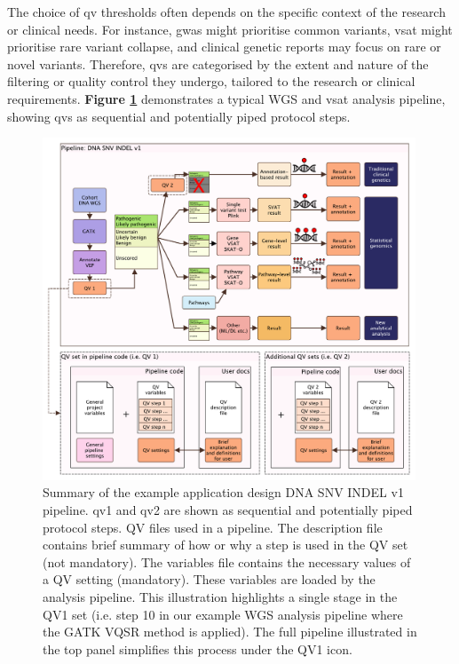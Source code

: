 The choice of \ac{qv} thresholds often depends on the specific context of the research or clinical needs. 
For instance, \ac{gwas} might prioritise common variants, 
\ac{vsat} might prioritise rare variant collapse, 
and clinical genetic reports may focus on rare or novel variants. 
Therefore, \ac{qv}s are categorised by the extent and nature of the filtering or quality control they undergo, tailored to the research or clinical requirements. 
\textbf{Figure \ref{fig:qv_pipeline_with_file_vcurrent}} 
demonstrates a typical WGS and \ac{vsat} analysis pipeline, showing \ac{qv}s as sequential and potentially piped protocol steps.

\begin{figure}[!h]
    \centering
   \includegraphics[width=0.99\textwidth]{./images/qv_pipeline_with_file_vcurrent.pdf}
    \caption{Summary of the example application design DNA SNV INDEL v1 pipeline. \ac{qv}1 and \ac{qv}2 are shown as sequential and potentially piped protocol steps.
    QV files used in a pipeline. The description file contains brief summary of how or why a step is used in the QV set (not mandatory). The variables file contains the necessary values of a QV setting (mandatory). These variables are loaded by the analysis pipeline. This illustration highlights a single stage in the QV1 set (i.e. step 10 in our example WGS analysis pipeline where the GATK VQSR method is applied). The full pipeline illustrated in the top panel simplifies this process under the QV1 icon.
    }
    \label{fig:qv_pipeline_with_file_vcurrent}
\end{figure}

